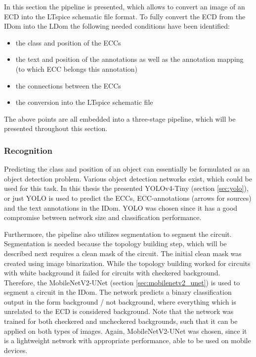 In this section the pipeline is presented, which allows to convert an image of an \ac{ECD} into the LTspice schematic file format.
To fully convert the \ac{ECD} from the \ac{IDom} into the \ac{LDom} the following needed conditions have been identified:

\begin{itemize}
    \item the class and position of the \acp{ECC}
    \item the text and position of the annotations as well as the annotation mapping (to which \ac{ECC} belongs this annotation)
    \item the connections between the \acp{ECC}
    \item the conversion into the LTspice schematic file
\end{itemize}

The above points are all embedded into a three-stage pipeline, which will be presented throughout this section.

\subsubsection{Recognition}

Predicting the class and position of an object can essentially be formulated as an object detection problem.
Various object detection networks exist, which could be used for this task.
In this thesis the presented \ac{YOLOv4}-Tiny (section \ref{sec:yolo}), or just \ac{YOLO} is used to predict the \acp{ECC}, \ac{ECC}-annotations (arrows for sources) and the text annotations in the \ac{IDom}.
\ac{YOLO} was chosen since it has a good compromise between network size and classification performance.

Furthermore, the pipeline also utilizes segmentation to segment the circuit.
Segmentation is needed because the topology building step, which will be described next requires a clean mask of the circuit.
The initial clean mask was created using image binarization.
While the topology building worked for circuits with white background it failed for circuits with checkered background.
Therefore, the MobileNetV2-UNet (section \ref{sec:mobilenetv2_unet}) is used to segment a circuit in the \ac{IDom}.
The network predicts a binary classification output in the form background / not background, where everything which is unrelated to the \ac{ECD} is considered background.
Note that the network was trained for both checkered and uncheckered backgrounds, such that it can be applied on both types of images.
Again, MobileNetV2-UNet was chosen, since it is a lightweight network with appropriate performance, able to be used on mobile devices.

